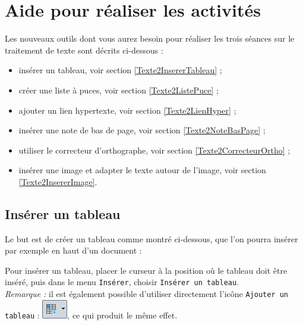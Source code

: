 
\newpage

\section{Aide pour réaliser les activités}\label{aide_seancesWord}


Les nouveaux outils dont vous aurez besoin pour réaliser les trois séances sur le traitement de texte sont décrits ci-dessous :


\begin{itemize}   
\item insérer un tableau, voir section \vref{Texte2InsererTableau} ;
\item créer une liste à puces, voir section \vref{Texte2ListePuce} ;
\item ajouter un lien hypertexte, voir section \vref{Texte2LienHyper} ;
\item insérer une note de bas de page, voir section \vref{Texte2NoteBasPage} ;
\item utiliser le correcteur d'orthographe, voir section \vref{Texte2CorrecteurOrtho} ;
\item insérer une image et adapter le texte autour de l'image, voir section \vref{Texte2InsererImage}.
\end{itemize}  



\subsection{Insérer un tableau}\label{Texte2InsererTableau} 



Le but est de créer un tableau comme montré ci-dessous, que l'on pourra insérer par exemple en haut d'un document :



Pour insérer un tableau, placer le curseur à la position où le tableau doit être inséré, puis dans le menu \texttt{Insérer}, choisir \texttt{Insérer un tableau}.\\ \emph{Remarque :} il est également possible d'utiliser directement l'icône \texttt{Ajouter un tableau} : \includegraphics[width=.6cm]{./images/texte02/InsererTableauIcone}, ce qui produit le même effet.

